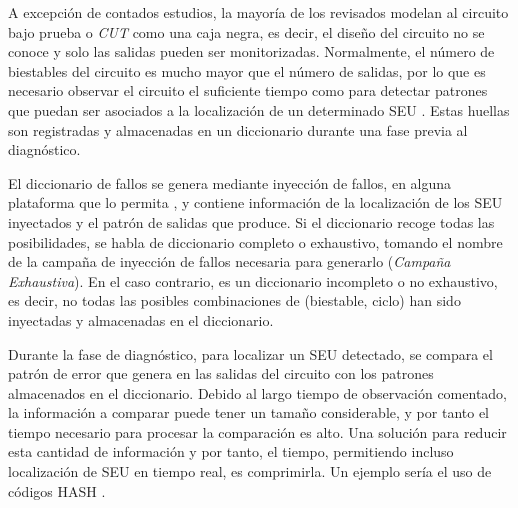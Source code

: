 A excepción de contados estudios, la mayoría de los revisados modelan al 
circuito bajo prueba o \textit{\gls{CUT}} como una caja negra, es decir, el diseño
del circuito no se conoce y solo las salidas pueden ser monitorizadas.
Normalmente, el número de biestables del circuito es mucho mayor que el número de
salidas, por lo que es necesario observar el circuito el suficiente tiempo como
para detectar patrones que puedan ser asociados a la localización de un
determinado \gls{SEU} \cite{SEUDiagnosis}. Estas huellas son registradas y
almacenadas en un diccionario durante una fase previa al diagnóstico.

El diccionario de fallos se genera mediante inyección de fallos, en alguna
plataforma que lo permita \cite{FastFI, LeonFI, FTU}, y contiene información de 
la localización de los \gls{SEU} inyectados y el patrón de salidas que produce. 
Si el diccionario recoge todas las posibilidades, se habla de diccionario 
completo o exhaustivo, tomando el nombre de la campaña de inyección de fallos 
necesaria para generarlo (\textit{Campaña Exhaustiva}). En el caso contrario, es 
un diccionario incompleto o no exhaustivo, es decir, no todas las posibles 
combinaciones de (biestable, ciclo) han sido inyectadas y almacenadas en el 
diccionario. 

Durante la fase de diagnóstico, para localizar un \gls{SEU} detectado, se compara
el patrón de error que genera en las salidas del circuito con los patrones
almacenados en el diccionario. Debido al largo tiempo de observación comentado, la
información a comparar puede tener un tamaño considerable, y por tanto el tiempo
necesario para procesar la comparación es alto. Una solución para reducir esta
cantidad de información y por tanto, el tiempo, permitiendo incluso localización
de \gls{SEU} en tiempo real, es comprimirla. Un ejemplo sería el uso de códigos 
HASH \cite{SEUDiagnosis}.


